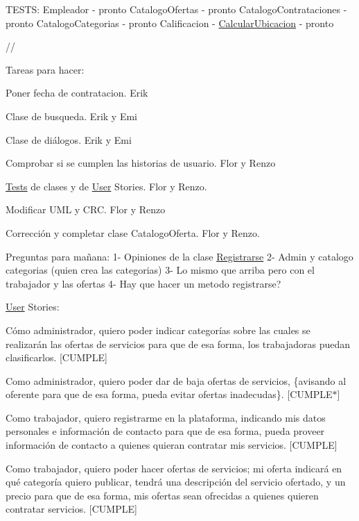 TESTS\+: Empleador -\/ pronto Catalogo\+Ofertas -\/ pronto Catalogo\+Contrataciones -\/ pronto Catalogo\+Categorias -\/ pronto Calificacion -\/ \mbox{\hyperlink{class_calcular_ubicacion}{Calcular\+Ubicacion}} -\/ pronto

//

Tareas para hacer\+:
\begin{DoxyItemize}
\item Poner fecha de contratacion. Erik
\item Clase de busqueda. Erik y Emi
\item Clase de diálogos. Erik y Emi
\item Comprobar si se cumplen las historias de usuario. Flor y Renzo
\item \mbox{\hyperlink{namespace_tests}{Tests}} de clases y de \mbox{\hyperlink{class_user}{User}} Stories. Flor y Renzo.
\item Modificar UML y CRC. Flor y Renzo
\item Corrección y completar clase Catalogo\+Oferta. Flor y Renzo.
\end{DoxyItemize}

Preguntas para mañana\+: 1-\/ Opiniones de la clase \mbox{\hyperlink{class_registrarse}{Registrarse}} 2-\/ Admin y catalogo categorias (quien crea las categorias) 3-\/ Lo mismo que arriba pero con el trabajador y las ofertas 4-\/ Hay que hacer un metodo registrarse?


\begin{DoxyItemize}
\item \mbox{\hyperlink{class_user}{User}} Stories\+:
\end{DoxyItemize}

Cómo administrador, quiero poder indicar categorías sobre las cuales se realizarán las ofertas de servicios para que de esa forma, los trabajadoras puedan clasificarlos. \mbox{[}CUMPLE\mbox{]}

Como administrador, quiero poder dar de baja ofertas de servicios, \{avisando al oferente para que de esa forma, pueda evitar ofertas inadecudas\}. \mbox{[}CUMPLE$\ast$\mbox{]}

Como trabajador, quiero registrarme en la plataforma, indicando mis datos personales e información de contacto para que de esa forma, pueda proveer información de contacto a quienes quieran contratar mis servicios. \mbox{[}CUMPLE\mbox{]}

Como trabajador, quiero poder hacer ofertas de servicios; mi oferta indicará en qué categoría quiero publicar, tendrá una descripción del servicio ofertado, y un precio para que de esa forma, mis ofertas sean ofrecidas a quienes quieren contratar servicios. \mbox{[}CUMPLE\mbox{]}

